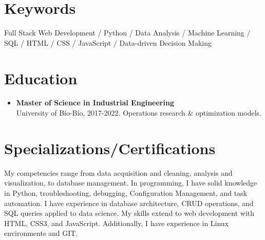 \documentclass[a4paper,10pt]{article}
\begin{document}
	
		\section*{Keywords}
	\small
	Full Stack Web Development / Python / Data Analysis / Machine Learning / SQL / HTML / CSS / JavaScript / Data-driven Decision Making
	
	\section*{Education}
	\begin{itemize}[left=0pt]
		\item \textbf{Master of Science in Industrial Engineering} \\
		University of Bío-Bío, 2017-2022. Operations research \& optimization models.
	\end{itemize}
	
	\section*{Specializations/Certifications}
				\small      
			My competencies range from data acquisition and cleaning, analysis and visualization, to database management. In programming, I have solid knowledge in Python, troubleshooting, debugging, Configuration Management, and task automation. I have experience in database architecture, CRUD operations, and SQL queries applied to data science. My skills extend to web development with HTML, CSS3, and JavaScript. Additionally, I have experience in Linux environments and GIT. 
\end{document}
